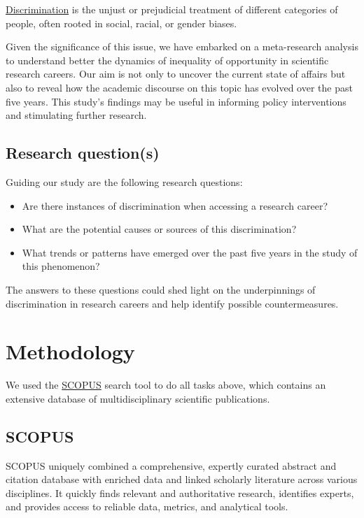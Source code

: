 \documentclass[runningheads]{llncs}
\begin{document}
\begin{definition}
\href{https://languages.oup.com/}{Discrimination} is the unjust or prejudicial treatment of different categories of people, often rooted in social, racial, or gender biases.
\end{definition}

Given the significance of this issue, we have embarked on a meta-research analysis to understand better the dynamics of inequality of opportunity in scientific research careers. Our aim is not only to uncover the current state of affairs but also to reveal how the academic discourse on this topic has evolved over the past five years. This study's findings may be useful in informing policy interventions and stimulating further research.

\subsection{Research question(s)}
Guiding our study are the following research questions:
\begin{itemize}
\item Are there instances of discrimination when accessing a research career?
\item What are the potential causes or sources of this discrimination?
\item What trends or patterns have emerged over the past five years in the study of this phenomenon?
\end{itemize}

The answers to these questions could shed light on the underpinnings of discrimination in research careers and help identify possible countermeasures.


\section{Methodology}
We used the \href{https://www.scopus.com/}{SCOPUS} search tool to do all tasks above, which contains an extensive database of multidisciplinary scientific publications.
\subsection{SCOPUS}
SCOPUS uniquely combined a comprehensive, expertly curated abstract and citation database with enriched data and linked scholarly literature across various disciplines. It quickly finds relevant and authoritative research, identifies experts, and provides access to reliable data, metrics, and analytical tools.
\end{document}
